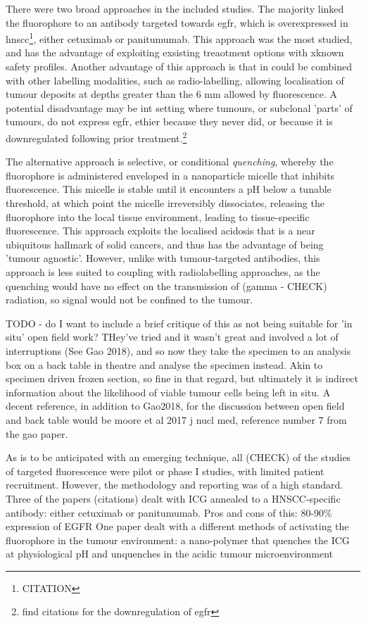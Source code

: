 There were two broad approaches in the included studies. 
The majority linked the fluorophore to an antibody targeted towards \gls{egfr}, which is overexpressed in \gls{hnscc}\footnote{CITATION}, either cetuximab or panitumumab.
This approach was the most studied, and has the advantage of exploiting exsisting treaotment options with xknown safety profiles.
Another advantage of this approach is that in could be combined with other labelling modalities, such as radio-labelling, allowing localisation of tumour deposits at depths greater than the 6 mm allowed by fluorescence.
A potential disadvantage  may be int setting where tumours, or subclonal 'parts' of tumours, do not express \gls{egfr}, ethier because they never did, or because it is downregulated following prior treatment.\footnote{find citations for the downregulation of egfr}

The alternative approach is selective, or conditional \textit{quenching}, whereby the fluorophore is administered enveloped in a nanoparticle micelle that inhibits fluorescence.
This micelle is stable until it encounters a pH below a tunable threshold, at which point the micelle irreversibly dissociates, releasing the fluorophore into the local tissue environment, leading to tissue-specific fluorescence.
This approach exploits the localised acidosis that is a near ubiquitous hallmark of solid cancers, and thus has the advantage of being 'tumour agnostic'.
However, unlike with tumour-targeted antibodies, this approach is less suited to coupling with radiolabelling approaches, as the quenching would have no effect on the transmission of (gamma - CHECK) radiation, so signal would not be confined to the tumour.

TODO - do I want to include a brief critique of this as not being suitable for 'in situ' open field work? 
THey've tried and it wasn't great and involved a lot of interruptions (See Gao 2018), and so now they take the specimen to an analysis box on a back table in theatre and analyse the specimen instead. 
Akin to specimen driven frozen section, so fine in that regard, but ultimately it is indirect information about the likelihood of viable tumour cells being left in situ.
A decent reference, in addition to Gao2018, for the discussion between open field and back table would be moore et al 2017 j nucl med, reference number 7 from the gao paper.

As is to be anticipated with an emerging technique, all (CHECK) of the studies of targeted fluorescence were pilot or phase I studies, with limited patient recruitment. However, the methodology and reporting was of a high standard.
Three of the papers (citations) dealt with ICG annealed to a HNSCC-specific antibody: either cetuximab or panitumumab.
Pros and cons of this: 80-90\% expression of EGFR
One paper  dealt with a different methods of activating the fluorophore in the tumour environment: a nano-polymer that quenches the ICG at physiological pH and unquenches in the acidic tumour microenvironment

